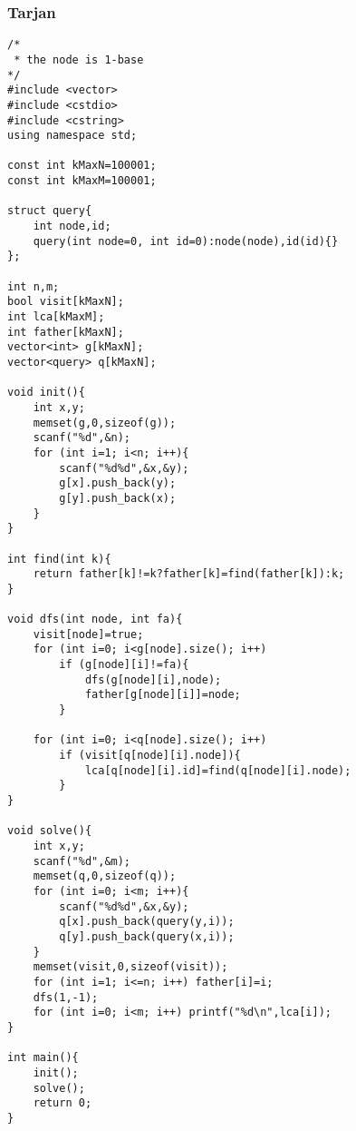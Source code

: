 \subsubsection{Tarjan}
\begin{verbatim}
/*
 * the node is 1-base
*/
#include <vector>
#include <cstdio>
#include <cstring>
using namespace std;

const int kMaxN=100001;
const int kMaxM=100001;

struct query{
    int node,id;
    query(int node=0, int id=0):node(node),id(id){}
};

int n,m;
bool visit[kMaxN];
int lca[kMaxM];
int father[kMaxN];
vector<int> g[kMaxN];
vector<query> q[kMaxN];

void init(){
    int x,y;
    memset(g,0,sizeof(g));
    scanf("%d",&n);
    for (int i=1; i<n; i++){
        scanf("%d%d",&x,&y);
        g[x].push_back(y);
        g[y].push_back(x);
    }
}

int find(int k){
    return father[k]!=k?father[k]=find(father[k]):k;
}

void dfs(int node, int fa){
    visit[node]=true;
    for (int i=0; i<g[node].size(); i++)
        if (g[node][i]!=fa){
            dfs(g[node][i],node);
            father[g[node][i]]=node;
        }

    for (int i=0; i<q[node].size(); i++)
        if (visit[q[node][i].node]){
            lca[q[node][i].id]=find(q[node][i].node);
        }
}

void solve(){
    int x,y;
    scanf("%d",&m);
    memset(q,0,sizeof(q));
    for (int i=0; i<m; i++){
        scanf("%d%d",&x,&y);
        q[x].push_back(query(y,i));
        q[y].push_back(query(x,i));
    }
    memset(visit,0,sizeof(visit));
    for (int i=1; i<=n; i++) father[i]=i;
    dfs(1,-1);
    for (int i=0; i<m; i++) printf("%d\n",lca[i]);
}

int main(){
    init();
    solve();
    return 0;
}
\end{verbatim}
